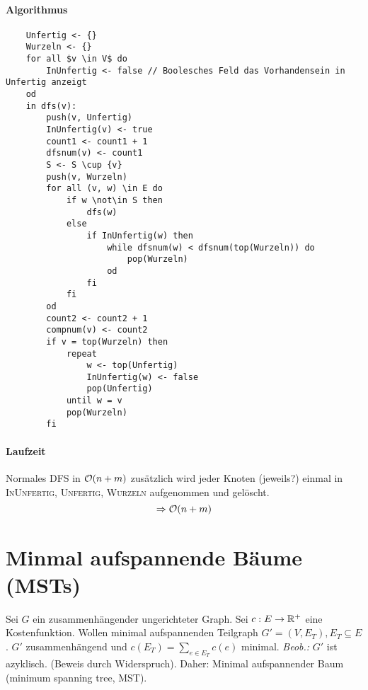         \paragraph{Algorithmus} 
\begin{verbatim}
    Unfertig <- {}
    Wurzeln <- {}
    for all $v \in V$ do
        InUnfertig <- false // Boolesches Feld das Vorhandensein in Unfertig anzeigt
    od
    in dfs(v):
        push(v, Unfertig)
        InUnfertig(v) <- true
        count1 <- count1 + 1
        dfsnum(v) <- count1
        S <- S \cup {v}
        push(v, Wurzeln)
        for all (v, w) \in E do
            if w \not\in S then
                dfs(w)
            else
                if InUnfertig(w) then
                    while dfsnum(w) < dfsnum(top(Wurzeln)) do
                        pop(Wurzeln)
                    od
                fi
            fi
        od
        count2 <- count2 + 1
        compnum(v) <- count2
        if v = top(Wurzeln) then
            repeat
                w <- top(Unfertig)
                InUnfertig(w) <- false
                pop(Unfertig)
            until w = v
            pop(Wurzeln)
        fi
\end{verbatim}
        \paragraph{Laufzeit}
            Normales DFS in $\mathcal{O}(n + m)$ zusätzlich wird jeder Knoten (jeweils?) einmal in \textsc{InUnfertig}, \textsc{Unfertig}, \textsc{Wurzeln} aufgenommen und gelöscht.
            $$
                \implies \LO(n + m)
            $$

    \section{Minmal aufspannende Bäume (MSTs)}
        Sei $G$ ein zusammenhängender ungerichteter Graph. Sei $c: E \to \mathbb{R}^+$ eine Kostenfunktion.
        Wollen minimal aufspannenden Teilgraph $G' = (V, E_T), E_T \subseteq E$. $G'$ zusammenhängend und $c(E_T) = \sum_{e \in E_T} c(e)$ minimal.
        \emph{Beob.:} $G'$ ist azyklisch. (Beweis durch Widerspruch). Daher: Minimal aufspannender Baum (minimum spanning tree, MST).

